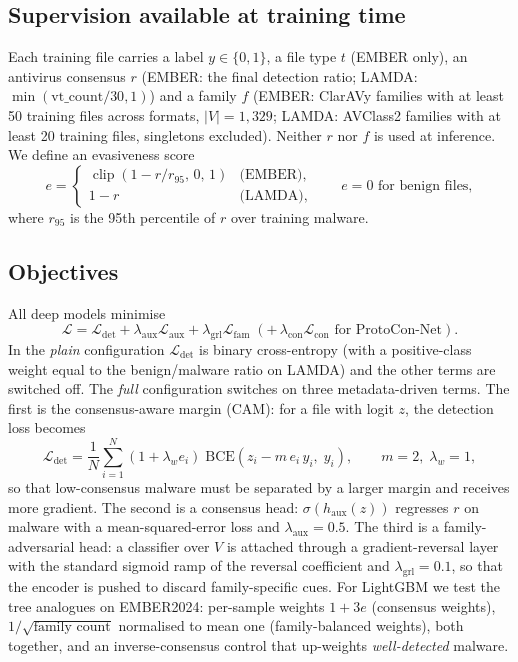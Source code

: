\documentclass[fleqn,10pt]{wlscirep}
\newcommand{\lgbm}{LightGBM}
\DeclareMathOperator{\clip}{clip}
\begin{document}
\subsection{Supervision available at training time}
Each training file carries a label $y \in \{0,1\}$, a file type $t$ (EMBER only), an antivirus consensus $r$ (EMBER: the final detection ratio; LAMDA: $\min(\mathrm{vt\_count}/30, 1)$) and a family $f$ (EMBER: ClarAVy families with at least 50 training files across formats, $|V| = 1{,}329$; LAMDA: AVClass2 families with at least 20 training files, singletons excluded). Neither $r$ nor $f$ is used at inference. We define an evasiveness score
\begin{equation}
e = \begin{cases} \clip(1 - r / r_{95},\, 0,\, 1) & \text{(EMBER)},\\ 1 - r & \text{(LAMDA)}, \end{cases}
\qquad e = 0 \text{ for benign files},
\label{eq:evasive}
\end{equation}
where $r_{95}$ is the 95th percentile of $r$ over training malware.

\subsection{Objectives}
\label{sec:objectives}
All deep models minimise
\begin{equation}
\mathcal{L} = \mathcal{L}_{\mathrm{det}} + \lambda_{\mathrm{aux}} \mathcal{L}_{\mathrm{aux}} + \lambda_{\mathrm{grl}} \mathcal{L}_{\mathrm{fam}} \;(+\, \lambda_{\mathrm{con}} \mathcal{L}_{\mathrm{con}} \text{ for ProtoCon-Net}).
\label{eq:loss}
\end{equation}
In the \emph{plain} configuration $\mathcal{L}_{\mathrm{det}}$ is binary cross-entropy (with a positive-class weight equal to the benign/malware ratio on LAMDA) and the other terms are switched off. The \emph{full} configuration switches on three metadata-driven terms. The first is the consensus-aware margin (CAM): for a file with logit $z$, the detection loss becomes
\begin{equation}
\mathcal{L}_{\mathrm{det}} = \frac{1}{N} \sum_{i=1}^{N} (1 + \lambda_w e_i)\; \mathrm{BCE}\!\left(z_i - m\, e_i\, y_i,\; y_i\right), \qquad m = 2,\; \lambda_w = 1,
\label{eq:cam}
\end{equation}
so that low-consensus malware must be separated by a larger margin and receives more gradient. The second is a consensus head: $\sigma(h_{\mathrm{aux}}(z))$ regresses $r$ on malware with a mean-squared-error loss and $\lambda_{\mathrm{aux}} = 0.5$. The third is a family-adversarial head: a classifier over $V$ is attached through a gradient-reversal layer\cite{ganin2016dann} with the standard sigmoid ramp of the reversal coefficient and $\lambda_{\mathrm{grl}} = 0.1$, so that the encoder is pushed to discard family-specific cues. For \lgbm{} we test the tree analogues on EMBER2024: per-sample weights $1 + 3e$ (consensus weights), $1/\sqrt{\text{family count}}$ normalised to mean one (family-balanced weights), both together, and an inverse-consensus control that up-weights \emph{well-detected} malware.
\end{document}
